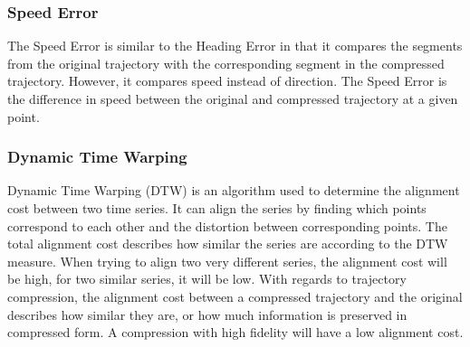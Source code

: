 \subsubsection{Speed Error}
The Speed Error is similar to the Heading Error in that it compares the segments from the original trajectory with the corresponding segment in the compressed trajectory. However, it compares speed instead of direction. The Speed Error is the difference in speed between the original and compressed trajectory at a given point.

\subsubsection{Dynamic Time Warping}
Dynamic Time Warping (DTW) is an algorithm used to determine the alignment cost between two time series. It can align the series by finding which points correspond to each other and the distortion between corresponding points. The total alignment cost describes how similar the series are according to the DTW measure. When trying to align two very different series, the alignment cost will be high, for two similar series, it will be low. With regards to trajectory compression, the alignment cost between a compressed trajectory and the original describes how similar they are, or how much information is preserved in compressed form. A compression with high fidelity will have a low alignment cost.

